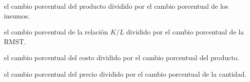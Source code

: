 \begin{opts}
    \item el cambio porcentual del producto dividido por el cambio porcentual de los insumos.
    \item el cambio porcentual de la relación $K/L$ dividido por el cambio porcentual de la RMST.
    \item el cambio porcentual del costo dividido por el cambio porcentual del producto.
    \item el cambio porcentual del precio dividido por el cambio porcentual de la cantidad.
\end{opts}
